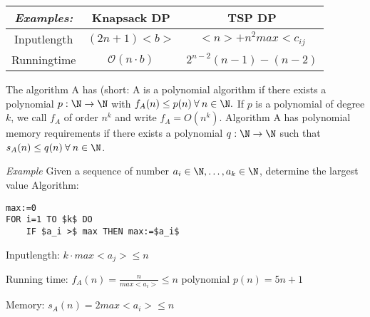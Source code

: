 \begin{xmp+}
	\begin{tabular}{c|c|c}
	\emph{Examples:} & Knapsack DP & TSP DP \\
	\hline
	Inputlength & $(2n+1)<b>$ & $<n>+n^2 max<c_{ij}$ \\
	Runningtime & $\mathcal{O} (n\cdot b)$ & $2^{n-2}(n-1)-(n-2)$ \\
	\end{tabular}
\end{xmp+}

The algorithm A has  (short: A is a polynomial algorithm if there exists a polynomial $p:\N \rightarrow \N $ with $f_A(n) \leq p(n) \: \forall \: n \in \N.$ If $p$ is a polynomial of degree $k$, we call $f_A$ of order $n^k$ and write $f_A= O(n^k)$. Algorithm A has polynomial memory requirements if there exists a polynomial $q:\N \rightarrow \N$ such that $s_A(n) \leq q(n) \: \forall \: n \in \N$.

\emph{Example} Given a sequence of number $ a_i\in \N, \dots, a_k \in \N$, determine the largest value
Algorithm:
\begin{lstlisting}
max:=0
FOR i=1 TO $k$ DO
	IF $a_i >$ max THEN max:=$a_i$
\end{lstlisting}
Inputlength: $k \cdot max<a_j> \leq n$

Running time: $f_A(n)=\frac n {max<a_i>} \leq n$
				polynomial $p(n)=5n+1 $
				
Memory: $s_A(n)=2 max<a_i> \leq n$
